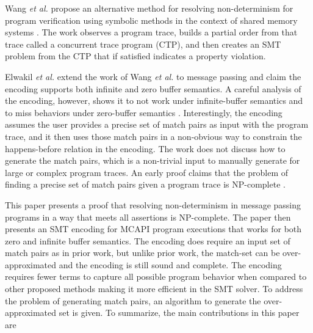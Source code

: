 Wang \textit{et al.} propose an alternative method for resolving
non-determinism for program verification using symbolic methods in the context
of shared memory systems \cite{wang:fse09}. The work observes a
program trace, builds a partial order from that trace called a
concurrent trace program (CTP), and then creates an SMT problem from
the CTP that if satisfied indicates a property violation. 

\examplefigone

Elwakil \textit{et al.} extend the work of Wang \textit{et al.} to
message passing and claim the encoding supports both infinite and zero buffer semantics. A
careful analysis of the encoding, however, shows it to not work under
infinite-buffer semantics and to miss behaviors under zero-buffer
semantics \cite{elwakil:padtad10}. Interestingly, the encoding assumes
the user provides a precise set of match pairs as input with the
program trace, and it then uses those match pairs in a non-obvious way
to constrain the happens-before relation in the encoding. The work
does not discuss how to generate the match pairs, which is a
non-trivial input to manually generate for large or complex program
traces. An early proof claims that the problem of finding a precise
set of match pairs given a program trace is NP-complete
\cite{match-pair-np-complete}.

 This paper presents a proof that resolving non-determinism in message
 passing programs in a way that meets all assertions is
 NP-complete. The paper then presents an SMT encoding for MCAPI
 program executions that works for both zero and infinite buffer
 semantics. The encoding does require an input set of match pairs as
 in prior work, but unlike prior work, the match-set can be
 over-approximated and the encoding is still sound and complete. The
 encoding requires fewer terms to capture all possible program
 behavior when compared to other proposed methods making it more
 efficient in the SMT solver.  To address the problem of generating
 match pairs, an algorithm to generate the over-approximated set is
 given. To summarize, the main contributions in this paper are

